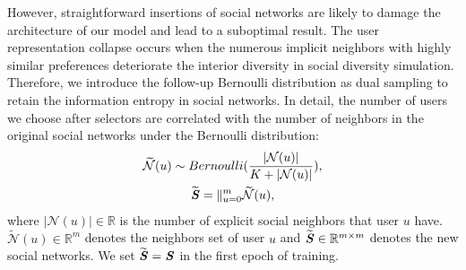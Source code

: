 \documentclass[letterpaper]{article} %
\begin{document}
However, straightforward insertions of social networks are likely to damage the architecture of our model and lead to a suboptimal result. The user representation collapse \cite{collapse} occurs when the numerous implicit neighbors with highly similar preferences deteriorate the interior diversity in social diversity simulation. Therefore, we introduce the follow-up Bernoulli distribution as dual sampling to retain the information entropy in social networks. In detail, the number of users we choose after selectors are correlated with the number of neighbors in the original social networks under the Bernoulli distribution:
\begin{gather}
    \widetilde{\mathcal{N}}(u) \sim Bernoulli(\frac{|\mathcal{N}(u)|}{K+|\mathcal{N}(u)|}),\\
    \widetilde{\textbf{\textit{S}}} = \mathbin\Vert_{u=0}^{m}\widetilde{\mathcal{N}}(u),
\end{gather}
where $|\mathcal{N}(u)| \in \mathbb{R}$ is the number of explicit social neighbors that user $u$ have. $\widetilde{\mathcal{N}}(u) \in \mathbb{R}^{m}$ denotes the neighbors set of user $u$ and  $\widetilde{\textbf{\textit{S}}} \in \mathbb{R}^{m\times m}$ denotes the new social networks. We set $\widetilde{\textbf{\textit{S}}}=\textbf{\textit{S}}$ in the first epoch of training.
\end{document}
